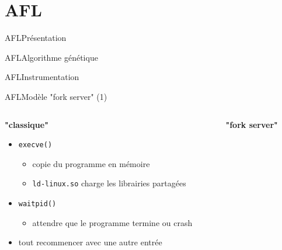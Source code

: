 \section{AFL}

\begin{frame}{AFL}{Présentation}
\end{frame}

\begin{frame}{AFL}{Algorithme génétique}
\end{frame}

\begin{frame}{AFL}{Instrumentation}
\end{frame}

\begin{frame}{AFL}{Modèle "fork server" (1)}
  \begin{columns}[t]
    \begin{column}{0.5\textwidth}
      \begin{center}
        \textbf{"classique"}
      \end{center}

      \begin{itemize}
      \item \lstinline{execve()}
        \begin{itemize}
        \item copie du programme en mémoire
        \item \lstinline{ld-linux.so} charge les librairies partagées
        \end{itemize}
      \item \lstinline{waitpid()}
        \begin{itemize}
        \item attendre que le programme termine ou crash
        \end{itemize}
      \item tout recommencer avec une autre entrée
      \end{itemize}
    \end{column}

    \begin{column}{0.5\textwidth}
      \begin{center}
        \textbf{"fork server"}
      \end{center}


\end{column}
\end{columns}
\end{frame}
